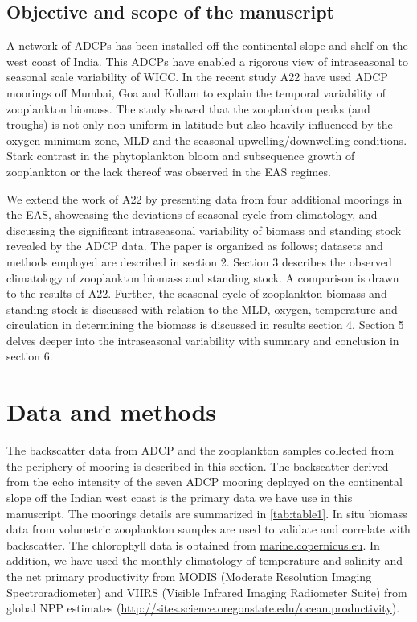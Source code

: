 \documentclass{article}
\begin{document}
	\subsection{Objective and scope of the manuscript}
	
	A network of ADCPs has been installed off the continental slope and shelf on the west coast of India. This ADCPs have enabled a rigorous view of intraseasonal to seasonal scale variability \citep{amol2014observed, chaudhuri2020observed} of WICC. In the recent study A22 have used ADCP moorings off  Mumbai, Goa and Kollam to explain the temporal variability of zooplankton biomass. The study showed that the zooplankton peaks (and troughs) is not only non-uniform in latitude but also heavily influenced by the oxygen minimum zone, MLD and the seasonal upwelling/downwelling conditions. Stark contrast in the phytoplankton bloom and subsequence  growth of zooplankton or the lack thereof was observed in the EAS regimes.
	
    We extend the work of A22 by presenting data from four additional moorings in the EAS, showcasing the deviations of seasonal cycle from climatology, and discussing the significant intraseasonal variability of biomass and standing stock revealed by the ADCP data. The paper is organized as follows; datasets and methods employed are described in section 2. Section 3 describes the observed climatology of zooplankton biomass and standing stock. A comparison is drawn to the results of A22. Further, the seasonal cycle of zooplankton biomass and standing stock is discussed with relation to the MLD, oxygen, temperature and circulation in determining the biomass is discussed in results section 4. Section 5 delves deeper into the intraseasonal variability with summary and conclusion in section 6.
	
	\section{Data and methods}
	The  backscatter data from ADCP and the zooplankton samples collected from the periphery of mooring is described in this section. The backscatter derived from the echo intensity of the seven ADCP mooring deployed on the continental slope off the Indian west coast is the primary data we have use in this manuscript. The moorings details are summarized in \autoref{tab:table1}. In situ biomass data from volumetric zooplankton samples are used to validate and correlate with backscatter. The chlorophyll data is obtained from \href{https://data.marine.copernicus.eu/products}{marine.copernicus.eu}. In addition, we have used the monthly climatology of temperature and salinity \citep{chatterjee2012new} and the net primary productivity from MODIS (Moderate Resolution Imaging Spectroradiometer) and VIIRS (Visible Infrared Imaging Radiometer Suite) from global NPP estimates (\href{http://sites.science.oregonstate.edu/ocean.productivity}{http://sites.science.oregonstate.edu/ocean.productivity}). 
	
\end{document}
